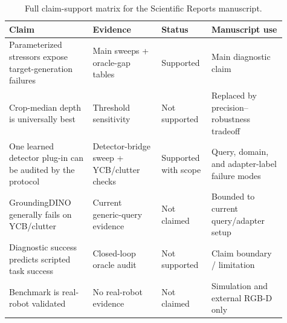 \begin{table}[t]
\centering
\caption{Full claim-support matrix for the Scientific Reports manuscript.}
\label{tab:claim-support-matrix-full}
\scriptsize
\setlength{\tabcolsep}{3pt}
\renewcommand{\arraystretch}{1.08}
\begin{tabular}{p{0.28\linewidth}p{0.23\linewidth}p{0.15\linewidth}p{0.25\linewidth}}
\toprule
Claim & Evidence & Status & Manuscript use \\
\midrule
Parameterized stressors expose target-generation failures & Main sweeps + oracle-gap tables & Supported & Main diagnostic claim \\
Crop-median depth is universally best & Threshold sensitivity & Not supported & Replaced by precision--robustness tradeoff \\
One learned detector plug-in can be audited by the protocol & Detector-bridge sweep + YCB/clutter checks & Supported with scope & Query, domain, and adapter-label failure modes \\
GroundingDINO generally fails on YCB/clutter & Current generic-query evidence & Not claimed & Bounded to current query/adapter setup \\
Diagnostic success predicts scripted task success & Closed-loop oracle audit & Not supported & Claim boundary / limitation \\
Benchmark is real-robot validated & No real-robot evidence & Not claimed & Simulation and external RGB-D only \\
\bottomrule
\end{tabular}
\end{table}
